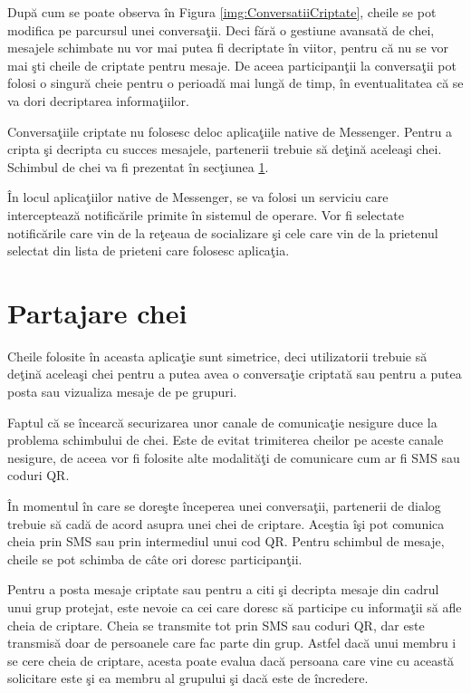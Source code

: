 
Dup\u{a} cum se poate observa \^{i}n Figura \ref{img:ConversatiiCriptate}, cheile se pot modifica pe parcursul unei conversa\c{t}ii. Deci f\u{a}r\u{a} o gestiune avansat\u{a} de chei, mesajele schimbate nu vor mai putea fi decriptate \^{i}n viitor, pentru c\u{a} nu se vor mai \c{s}ti cheile de criptate pentru mesaje. De aceea participan\c{t}ii la conversa\c{t}ii pot folosi o singur\u{a} cheie pentru o perioad\u{a} mai lung\u{a} de timp, \^{i}n eventualitatea c\u{a} se va dori decriptarea informa\c{t}iilor.

Conversa\c{t}iile criptate nu folosesc deloc aplica\c{t}iile native de Messenger. Pentru a cripta \c{s}i decripta cu succes mesajele, partenerii trebuie s\u{a} de\c{t}in\u{a} acelea\c{s}i chei. Schimbul de chei va fi prezentat \^{i}n sec\c{t}iunea \ref{chei}.

\^{I}n locul aplica\c{t}iilor native de Messenger, se va folosi un serviciu care intercepteaz\u{a} notific\u{a}rile primite \^{i}n sistemul de operare. Vor fi selectate notific\u{a}rile care vin de la re\c{t}eaua de socializare \c{s}i cele care vin de la prietenul selectat din lista de prieteni care folosesc aplica\c{t}ia.

\section{Partajare chei}
\label{chei}

Cheile folosite \^{i}n aceasta aplica\c{t}ie sunt simetrice, deci utilizatorii trebuie s\u{a} de\c{t}in\u{a} acelea\c{s}i chei pentru a putea avea o conversa\c{t}ie criptat\u{a} sau pentru a putea posta sau vizualiza mesaje de pe grupuri.

Faptul c\u{a} se \^{i}ncearc\u{a} securizarea unor canale de comunica\c{t}ie nesigure duce la problema schimbului de chei. Este de evitat trimiterea cheilor pe aceste canale nesigure, de aceea vor fi folosite alte modalit\u{a}\c{t}i de comunicare cum ar fi SMS sau coduri QR.

\^{I}n momentul \^{i}n care se dore\c{s}te \^{i}nceperea unei conversa\c{t}ii, partenerii de dialog trebuie s\u{a} cad\u{a} de acord asupra unei chei de criptare. Ace\c{s}tia \^{i}\c{s}i pot comunica cheia prin SMS sau prin intermediul unui cod QR. Pentru schimbul de mesaje, cheile se pot schimba de c\^{a}te ori doresc participan\c{t}ii.

Pentru a posta mesaje criptate sau pentru a citi \c{s}i decripta mesaje din cadrul unui grup protejat, este nevoie ca cei care doresc s\u{a} participe cu informa\c{t}ii s\u{a} afle cheia de criptare. Cheia se transmite tot prin SMS sau coduri QR, dar este transmis\u{a} doar de persoanele care fac parte din grup. Astfel dac\u{a} unui membru i se cere cheia de criptare, acesta poate evalua dac\u{a} persoana care vine cu aceast\u{a} solicitare este \c{s}i ea membru al grupului \c{s}i dac\u{a} este de \^{i}ncredere.